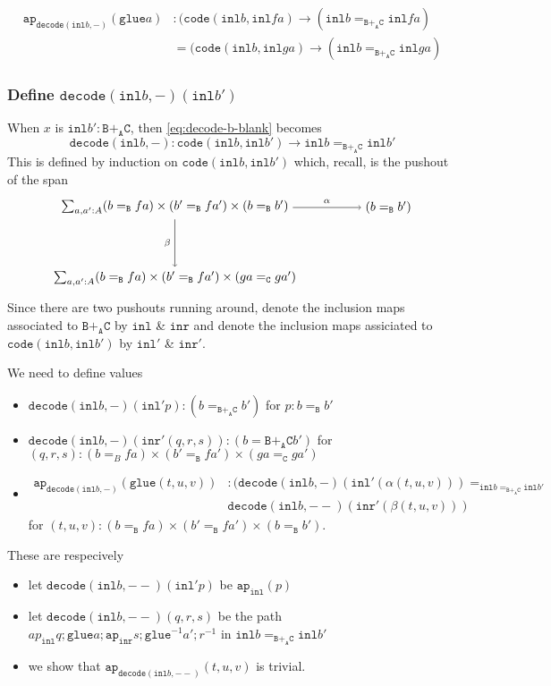 \message{ !name(notes.tex)}\documentclass[12pt]{amsart}
\newcommand{\from}{\colon}
\newcommand{\type}[1]{\mathtt{#1}}
\newcommand{\tin}{\colon}
\newcommand{\A}{\type{A}}
\newcommand{\B}{\type{B}}
\newcommand{\C}{\type{C}}
\newcommand{\BAC}{\B +_{\A} \C}
\newcommand{\ap}{\type{ap}}
\newcommand{\inl}{\type{inl}}
\newcommand{\inr}{\type{inr}}
\newcommand{\glue}{\type{glue}}
\newcommand{\code}{\type{code}}
\newcommand{\decode}{\type{decode}}
\theoremstyle{remark}
\theoremstyle{definition}
\begin{document}
\begin{align*}
  \ap_{\decode ( \inl b , - )} (\glue a) &
  \tin
  ( \code ( \inl b , \inl fa ) \to ( \inl b =_{\BAC} \inl fa ) \\
  & =
  ( \code ( \inl b , \inl ga ) \to ( \inl b =_{\BAC} \inl ga )
\end{align*}


\subsubsection{Define \( \decode ( \inl b , - ) ( \inl b' ) \)} %

When \( x \) is \( \inl b' \tin \BAC \), then \ref{eq:decode-b-blank} becomes
\[
  \decode ( \inl b , - )
  \from
  \code ( \inl b , \inl b' )
  \to
  \inl b =_{\BAC} \inl b'
\]
This is defined by induction on \( \code ( \inl b , \inl b' ) \)
which, recall, is the
pushout of the span
\[
\begin{tikzpicture}
  \node (1) at (0,2) { $ \sum_{ a , a' : A }
    ( b =_\B fa ) \times ( b' =_\B fa' ) \times ( b =_\B b' ) $ };
  \node (2) at (6,2) { $ ( b =_\B b' ) $ };
  \node (3) at (0,0) { $ \sum_{ a , a' : A }
    ( b =_\B fa ) \times (b' =_\B fa' ) \times ( ga =_\C ga' ) $ };
  \draw [ -> ] (1) to node [above] {\scriptsize $ \alpha $} (2);
  \draw [ -> ] (1) to node [left] {\scriptsize $ \beta $} (3);
\end{tikzpicture}
\]
Since there are two pushouts running around, denote the inclusion maps
associated to \( \BAC \) by \( \inl \) \& \( \inr \) and denote the
inclusion maps assiciated to \( \code ( \inl b , \inl b' ) \) by \(
\inl' \) \& \( \inr' \). 

We need to define values
%
\begin{itemize}
\item
  \( \decode ( \inl b, - ) (\inl' p) \tin ( b =_{\BAC} b' ) \) for \( p
  \tin b =_{\B} b' \)
\item
  \( \decode (\inl b, - ) ( \inr' (q,r,s) ) \tin ( b ={\BAC} b' ) \)
  for
  \( (q,r,s) \tin ( b =_B fa ) \times (b' =_\B fa' ) \times ( ga =_\C
  ga' ) \)
\item
  \begin{align*}
    \ap_{\decode ( \inl b , - )} ( \glue (t,u,v) ) & \tin
    ( \decode ( \inl b, - ) ( \inl' ( \alpha (t,u,v) ) ) =_{\inl b
    =_{\BAC} \inl b'} \\
    & \decode ( \inl b, -- ) ( \inr' ( \beta (t,u,v) ) )
  \end{align*}
  for \( (t,u,v) \tin ( b =_\B fa ) \times
  ( b' =_\B fa' ) \times ( b =_\B b' ) \). 
\end{itemize}
%
These are respecively
%
\begin{itemize}
\item
  let \( \decode ( \inl b , -- ) ( \inl' p ) \) be
  \( \ap_{\inl} (p) \)
\item
  let \( \decode ( \inl b , -- ) (q,r,s) \) be the path
  \( ap_{\inl} q ; \glue a ; \ap_{\inr} s ; \glue^{-1} a' ; r^{-1} \) in
  \( \inl b =_{\BAC} \inl b' \)
\item
  we show that \( \ap_{\decode ( \inl b , -- )} (t,u,v) \) is trivial.
\end{itemize}
\end{document}
